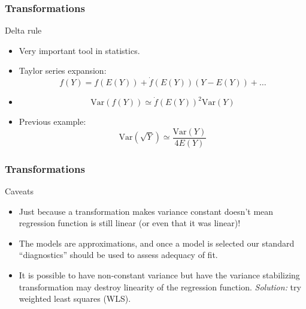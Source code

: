 \documentclass[handout]{beamer}
\begin{document}
   \begin{frame} \frametitle{Transformations}

   \begin{block}
   {Delta rule}

   \begin{itemize}


   \item Very important tool in statistics.
   \item Taylor series expansion:
   $$
   f(Y) = f(E(Y)) + \dot{f}(E(Y)) (Y - E(Y)) + \dots $$

   \item
   $$
   \text{Var}(f(Y)) \simeq \dot{f}(E(Y))^2 \text{Var}(Y)$$

   \item  Previous example:
   $$\text{Var}(\sqrt{Y}) \simeq \frac{\text{Var}(Y)}{4E(Y)}
   $$

   \end{itemize}
   \end{block}
   \end{frame}


   \begin{frame} \frametitle{Transformations}

   \begin{block}
   {Caveats                     }
   \begin{itemize}

   \item Just because a transformation makes variance
   constant doesn't mean regression function is still linear (or even that it was linear)!

   \item The models are approximations, and once a model is selected
   our standard ``diagnostics'' should be used to assess adequacy of fit.

   \item It is possible to have non-constant variance
   but have the variance stabilizing transformation may destroy linearity of the regression function. {\em Solution:} try weighted least squares (WLS).

   \end{itemize}

   \end{block}
   \end{frame}

\end{document}
